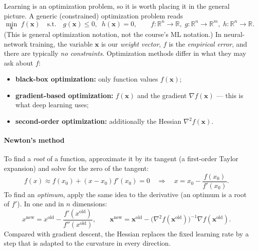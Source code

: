 \documentclass[11pt, oneside]{book}
\newcommand{\R}{\mathbb{R}}
\newcommand{\grad}{\nabla}               %
\newcommand{\hess}{\nabla^2}             %
\newcommand{\inv}{^{-1}}                 %
\newcommand{\bx}{\bm{x}}        \newcommand{\by}{\bm{y}}
\begin{document}
Learning is an optimization problem, so it is worth placing it in the
general picture. A generic (constrained) optimization problem reads
\[
  \min_{\bx}\; f(\bx) \quad\text{s.t.}\quad g(\bx) \le 0,\;\; h(\bx) = 0,
  \qquad f: \R^n \to \R,\; g: \R^n \to \R^m,\; h: \R^n \to \R .
\]
(This is general optimization notation, not the course's ML notation.) In
neural-network training, the variable $\bx$ is our \emph{weight vector},
$f$ is the \emph{empirical error}, and there are typically \emph{no
constraints}. Optimization methods differ in what they may ask about $f$:
\begin{itemize}
  \item \textbf{black-box optimization:} only function values $f(\bx)$;
  \item \textbf{gradient-based optimization:} $f(\bx)$ and the gradient
    $\grad f(\bx)$ --- this is what deep learning uses;
  \item \textbf{second-order optimization:} additionally the Hessian
    $\hess f(\bx)$.
\end{itemize}

\paragraph{Newton's method}
To find a \emph{root} of a function, approximate it by its tangent (a
first-order Taylor expansion) and solve for the zero of the tangent:
\[
  f(x) \approx f(x_0) + (x - x_0) f'(x_0) = 0
  \quad\Longrightarrow\quad
  x = x_0 - \frac{f(x_0)}{f'(x_0)} .
\]
To find an \emph{optimum}, apply the same idea to the derivative (an
optimum is a root of $f'$). In one and in $n$ dimensions:
\[
  x^{\text{new}} = x^{\text{old}} - \frac{f'(x^{\text{old}})}{f''(x^{\text{old}})},
  \qquad
  \bx^{\text{new}} = \bx^{\text{old}} - \bigl(\hess f(\bx^{\text{old}})\bigr)\inv \grad f(\bx^{\text{old}}).
\]
Compared with gradient descent, the Hessian replaces the fixed learning rate
by a step that is adapted to the curvature in every direction.
\end{document}
